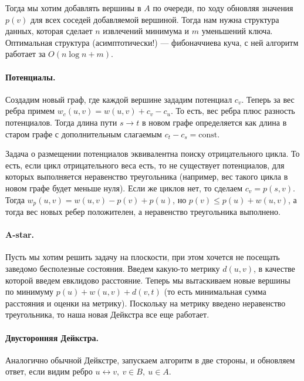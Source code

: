 \documentclass[12pt]{article}
\begin{document}
Тогда мы хотим добавлять вершины в $A$ по очереди, по ходу обновляя значения $p(v)$ для всех соседей добавляемой вершиной. Тогда нам нужна структура данных, которая сделает $n$ извлечений минимума и $m$ уменьшений ключа. Оптимальная структура (асимптотически!) --- фибоначчиева куча, с ней алгоритм работает за $O(n \log n + m)$.

\paragraph{Потенциалы.} Создадим новый граф, где каждой вершине зададим потенциал $c_v$. Теперь за вес ребра примем $w_c(u, v) = w(u, v) + c_v - c_u$. То есть, вес ребра плюс разность потенциалов. Тогда длина пути $s \rightarrow t$ в новом графе определяется как длина в старом графе с дополнительным слагаемым $c_t - c_s = \text{const}$.

Задача о размещении потенциалов эквивалентна поиску отрицательного цикла. То есть, если цикл отрицательного веса есть, то не существует потенциалов, для которых выполняется неравенство треугольника (например, вес такого цикла в новом графе будет меньше нуля). Если же циклов нет, то сделаем $c_v = p(s, v)$. Тогда $w_p(u, v) = w(u, v) - p(v) + p(u)$, но $p(v) \le p(u) + w(u, v)$, а тогда вес новых ребер положителен, а неравенство треугольника выполнено.

\paragraph{A-star.} Пусть мы хотим решить задачу на плоскости, при этом хочется не посещать заведомо бесполезные состояния. Введем какую-то метрику $d(u, v)$, в качестве которой введем евклидово расстояние. Теперь мы вытаскиваем новые вершины по минимуму $p(u) + w(u, v) + d(v, t)$ (то есть минимальная сумма расстояния и оценки на метрику). Поскольку на метрику введено неравенство треугольника, то наша новая Дейкстра все еще работает.

\paragraph{Двусторонняя Дейкстра.} Аналогично обычной Дейкстре, запускаем алгоритм в две стороны, и обновляем ответ, если видим ребро $u \leftrightarrow v,\ v \in B,\ u \in A$.
\end{document}

